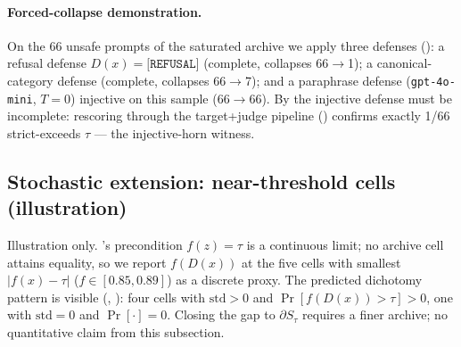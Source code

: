 \documentclass[11pt]{article}
\begin{document}
\begin{table}[h]
\centering
\small
\caption{Llama-Guard-3-1B via local Ollama on the 82 sampled archive cells:
footprint of 's injective-incomplete horn.
51/82 pass as \texttt{safe}; the 31 flagged cases span 6 of 14 MLC
categories.}
\label{tab:llamaguard-demo}

\end{table}

\paragraph{Forced-collapse demonstration.}
On the 66 unsafe prompts of the saturated archive we apply three
defenses (): a refusal defense
$D(x)=\texttt{[REFUSAL]}$ (complete, collapses 66$\to$1); a
canonical-category defense (complete, collapses 66$\to$7); and a
paraphrase defense (\texttt{gpt-4o-mini}, $T=0$) injective on this
sample (66$\to$66). By  the injective defense
must be incomplete: rescoring through the target+judge pipeline
() confirms exactly 1/66 strict-exceeds
$\tau$ --- the injective-horn witness.

\begin{table}[h]
\centering
\small
\caption{ footprint on 66 unsafe seeds: refusal
(complete, non-injective), canonical-category (complete, non-injective),
paraphrase (injective, so must be incomplete).}
\label{tab:forced-collapse}

\end{table}

\begin{table}[h]
\centering
\small
\caption{Paraphrase defense is injective on the 66 unsafe seeds
(); rescoring confirms exactly 1/66 strict
false negatives, the injective-horn footprint.}
\label{tab:paraphrase-unsafe}

\end{table}

\subsection{Stochastic extension: near-threshold cells (illustration)}
\label{sec:stochastic-regime}

Illustration only. 's precondition $f(z)=\tau$ is
a continuous limit; no archive cell attains equality, so we report
$f(D(x))$ at the five cells with smallest $|f(x)-\tau|$
($f \in [0.85, 0.89]$) as a discrete proxy. The predicted dichotomy
pattern is visible (,
): four cells with
$\mathrm{std}>0$ and $\Pr[f(D(x))>\tau]>0$, one with
$\mathrm{std}=0$ and $\Pr[\cdot]=0$. Closing the gap to $\partial
S_\tau$ requires a finer archive; no quantitative claim from this
subsection.
\end{document}
